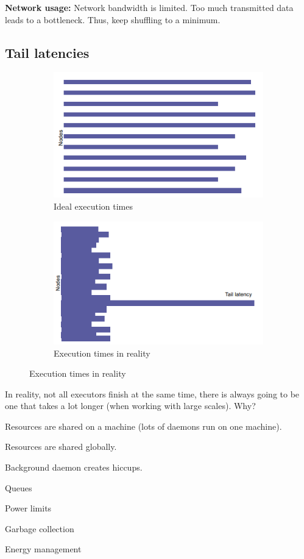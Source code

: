 \documentclass[11pt,oneside,a4paper]{article}
\begin{document}
{\textbf{Network usage:} Network bandwidth is limited. Too much transmitted data leads to a bottleneck. Thus, keep shuffling to a minimum.\\

\subsection{Tail latencies}

\begin{figure}[hb!]
	\centering
	\begin{subfigure}[t]{.5\textwidth}
		\centering
		\includegraphics[width=0.4\linewidth]{figures/performance_time_ideal}
		\caption{Ideal execution times}
	\end{subfigure}%
	\begin{subfigure}[t]{.5\textwidth}
		\centering
		\includegraphics[width=0.4\linewidth]{figures/performance_time_real}
		\caption{Execution times in reality}
	\end{subfigure}
\end{figure}

In reality, not all executors finish at the same time, there is always going to be one that takes a lot longer (when working with large scales). Why?

\begin{compactitem}
\item Resources are shared on a machine (lots of daemons run on one machine).
\item Resources are shared globally.
\item Background daemon creates hiccups.
\item Queues
\item Power limits
\item Garbage collection
\item Energy management 
\end{compactitem}

}
\end{document}
